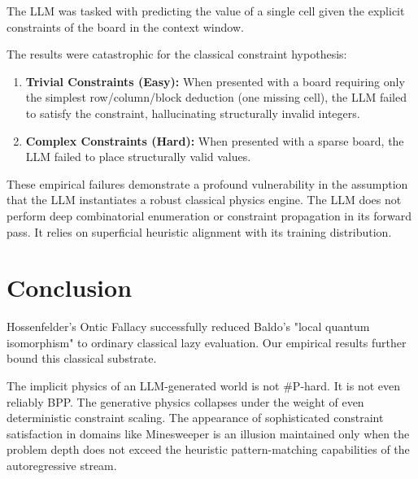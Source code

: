 \documentclass[12pt,a4paper]{article}
\begin{document}
The LLM was tasked with predicting the value of a single cell given the explicit constraints of the board in the context window.

The results were catastrophic for the classical constraint hypothesis:
\begin{enumerate}
    \item \textbf{Trivial Constraints (Easy):} When presented with a board requiring only the simplest row/column/block deduction (one missing cell), the LLM failed to satisfy the constraint, hallucinating structurally invalid integers.
    \item \textbf{Complex Constraints (Hard):} When presented with a sparse board, the LLM failed to place structurally valid values.
\end{enumerate}

These empirical failures demonstrate a profound vulnerability in the assumption that the LLM instantiates a robust classical physics engine. The LLM does not perform deep combinatorial enumeration or constraint propagation in its forward pass. It relies on superficial heuristic alignment with its training distribution.

\section{Conclusion}

Hossenfelder's Ontic Fallacy successfully reduced Baldo's "local quantum isomorphism" to ordinary classical lazy evaluation. Our empirical results further bound this classical substrate.

The implicit physics of an LLM-generated world is not \#P-hard. It is not even reliably BPP. The generative physics collapses under the weight of even deterministic constraint scaling. The appearance of sophisticated constraint satisfaction in domains like Minesweeper is an illusion maintained only when the problem depth does not exceed the heuristic pattern-matching capabilities of the autoregressive stream.
\end{document}
